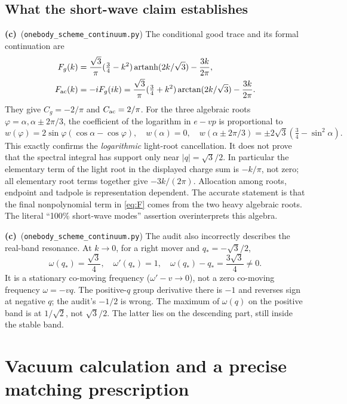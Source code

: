 \documentclass[11pt,a4paper]{article}
\newcommand{\Lc}{\textbf{(c)}\ }
\newcommand{\ccheck}{\texttt{onebody\_\allowbreak scheme\_\allowbreak continuum.py}}
\begin{document}
\subsection{What the short-wave claim establishes}
\Lc (\ccheck) The conditional good trace and its formal continuation are
\begin{align}
 F_g(k)&=\frac{\sqrt3}{\pi}(\tfrac34-k^2)
            \operatorname{artanh}(2k/\sqrt3)-\frac{3k}{2\pi},\\
 F_{\rm ac}(k)&=-iF_g(ik)
 =\frac{\sqrt3}{\pi}(\tfrac34+k^2)
            \arctan(2k/\sqrt3)-\frac{3k}{2\pi}.
 \label{eq:F}
\end{align}
They give $C_g=-2/\pi$ and $C_{\rm ac}=2/\pi$. For the three algebraic
roots $\varphi=\alpha,\alpha\pm2\pi/3$, the coefficient of the logarithm
in $e-vp$ is proportional to
\begin{equation}\label{eq:weights}
 w(\varphi)=2\sin\varphi(\cos\alpha-\cos\varphi),\quad
 w(\alpha)=0,\quad
 w(\alpha\pm2\pi/3)=\pm2\sqrt3(\tfrac34-\sin^2\alpha).
\end{equation}
This exactly confirms the \emph{logarithmic} light-root cancellation.
It does not prove that the spectral integral has support only near
$|q|=\sqrt3/2$. In particular the elementary term of the light root in
the displayed charge sum is $-k/\pi$, not zero; all elementary root terms
together give $-3k/(2\pi)$. Allocation among roots, endpoint and tadpole
is representation dependent. The accurate statement is that the final
nonpolynomial term in \eqref{eq:F} comes from the two heavy algebraic roots.
The literal ``100\% short-wave modes'' assertion overinterprets this algebra.

\Lc (\ccheck) The audit also incorrectly describes the real-band
resonance. At $k\to0$, for a right mover and $q_*=-\sqrt3/2$,
\begin{equation}\label{eq:resonance}
 \omega(q_*)=\frac{\sqrt3}{4},\quad
 \omega'(q_*)=1,\quad
 \omega(q_*)-q_*=\frac{3\sqrt3}{4}\ne0.
\end{equation}
It is a stationary co-moving frequency ($\omega'-v\to0$), not a zero
co-moving frequency $\omega=-vq$. The positive-$q$ group derivative there
is $-1$ and reverses sign at negative $q$; the audit's $-1/2$ is wrong.
The maximum of $\omega(q)$ on the positive band is at $1/\sqrt2$, not
$\sqrt3/2$. The latter lies on the descending part, still inside the
stable band.

\section{Vacuum calculation and a precise matching prescription}
\end{document}
